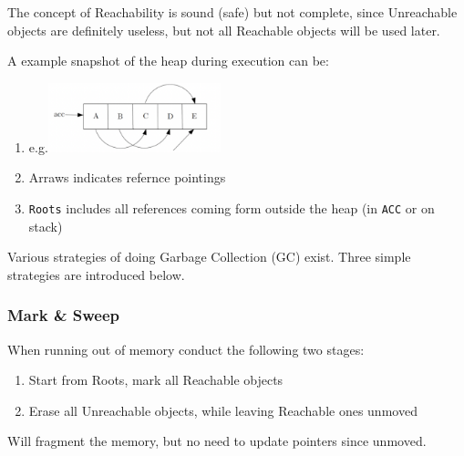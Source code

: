 \documentclass[a4paper]{exam}
\theoremstyle{definition}
\begin{document}
The concept of Reachability is sound (safe) but not complete, since Unreachable objects are definitely useless, but not all Reachable objects will be used later.

A example snapshot of the heap during execution can be:

\begin{enumerate}
    \item e.g.\includegraphics[width=5cm]{img/reachability.png}
    \item Arraws indicates refernce pointings
    \item \texttt{Roots} includes all references coming form outside the heap (in \texttt{ACC} or on stack)
\end{enumerate}
Various strategies of doing Garbage Collection (GC) exist. Three simple strategies are introduced below.
\subsubsection{Mark \& Sweep}
When running out of memory conduct the following two stages:
\begin{enumerate}
    \item Start from Roots, mark all Reachable objects
\item Erase all Unreachable objects, while leaving Reachable ones unmoved
\end{enumerate}
Will fragment the memory, but no need to update pointers since unmoved.
\end{document}
